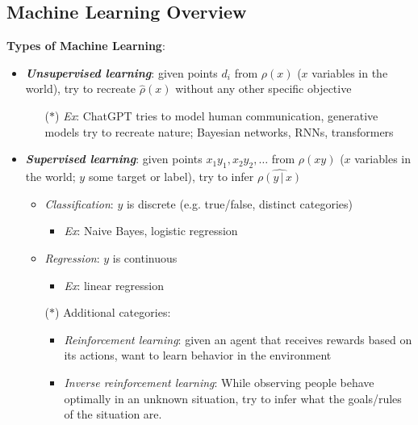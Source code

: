 \documentclass[12pt]{extarticle}
\theoremstyle{definition}
\theoremstyle{remark}
\newcommand{\term}[1]{\noindent\textbf{\textit{#1}}}
\newcommand{\cond}[2]{#1\,\vert\,#2}
\begin{document}
\subsection{Machine Learning Overview}
\textbf{Types of Machine Learning}: \begin{itemize}
    \item \term{Unsupervised learning}: given points $d_i$ from $\rho(x)$ ($x$ variables in the world), try to recreate $\hat{\rho}(x)$ without any other specific objective \begin{itemize}
        \item[($\ast$)] \textit{Ex}: ChatGPT tries to model human communication, generative models try to recreate nature; Bayesian networks, RNNs, transformers
    \end{itemize}
    \item \term{Supervised learning}: given points $x_1y_1,x_2y_2,\hdots$ from $\rho(xy)$ ($x$ variables in the world; $y$ some target or label), try to infer $\hat{\rho(\cond{y}{x})}$ \begin{itemize}
        \item \textit{Classification}: $y$ is discrete (e.g. true/false, distinct categories) \begin{itemize}
            \item \textit{Ex}: Naive Bayes, logistic regression
        \end{itemize}
        \item \textit{Regression}: $y$ is continuous \begin{itemize}
            \item \textit{Ex}: linear regression
        \end{itemize}
        \item[($\ast$)] Additional categories: \begin{itemize}
            \item \textit{Reinforcement learning}: given an agent that receives rewards based on its actions, want to learn behavior in the environment
            \item \textit{Inverse reinforcement learning}: While observing people behave optimally in an unknown situation, try to infer what the goals/rules of the situation are.
        \end{itemize}
    \end{itemize}
\end{itemize}
\end{document}
